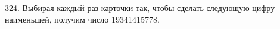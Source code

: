 324. Выбирая каждый раз карточки так, чтобы сделать следующую цифру наименьшей, получим число 19341415778.\\
